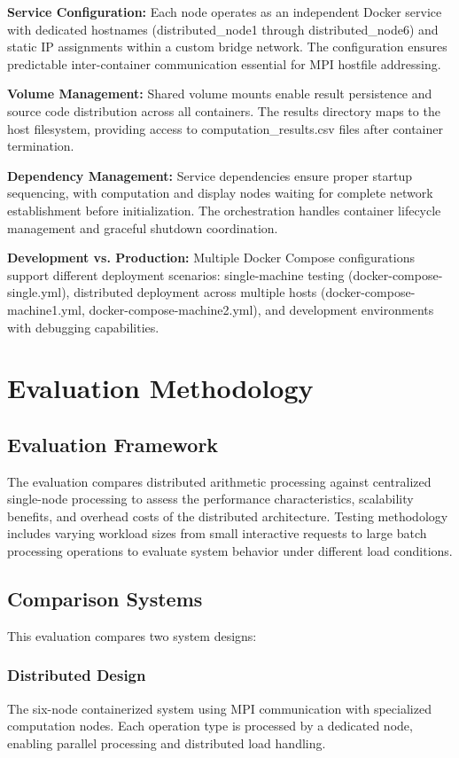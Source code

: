 \documentclass{article}
\begin{document}
\textbf{Service Configuration:} Each node operates as an independent Docker service with dedicated hostnames (distributed\_node1 through distributed\_node6) and static IP assignments within a custom bridge network. The configuration ensures predictable inter-container communication essential for MPI hostfile addressing.

\textbf{Volume Management:} Shared volume mounts enable result persistence and source code distribution across all containers. The results directory maps to the host filesystem, providing access to computation\_results.csv files after container termination.

\textbf{Dependency Management:} Service dependencies ensure proper startup sequencing, with computation and display nodes waiting for complete network establishment before initialization. The orchestration handles container lifecycle management and graceful shutdown coordination.

\textbf{Development vs. Production:} Multiple Docker Compose configurations support different deployment scenarios: single-machine testing (docker-compose-single.yml), distributed deployment across multiple hosts (docker-compose-machine1.yml, docker-compose-machine2.yml), and development environments with debugging capabilities.

\section{Evaluation Methodology}

\subsection{Evaluation Framework}
The evaluation compares distributed arithmetic processing against centralized single-node processing to assess the performance characteristics, scalability benefits, and overhead costs of the distributed architecture. Testing methodology includes varying workload sizes from small interactive requests to large batch processing operations to evaluate system behavior under different load conditions.

\subsection{Comparison Systems}
This evaluation compares two system designs:

\subsubsection{Distributed Design}
The six-node containerized system using MPI communication with specialized computation nodes. Each operation type is processed by a dedicated node, enabling parallel processing and distributed load handling.
\end{document}
